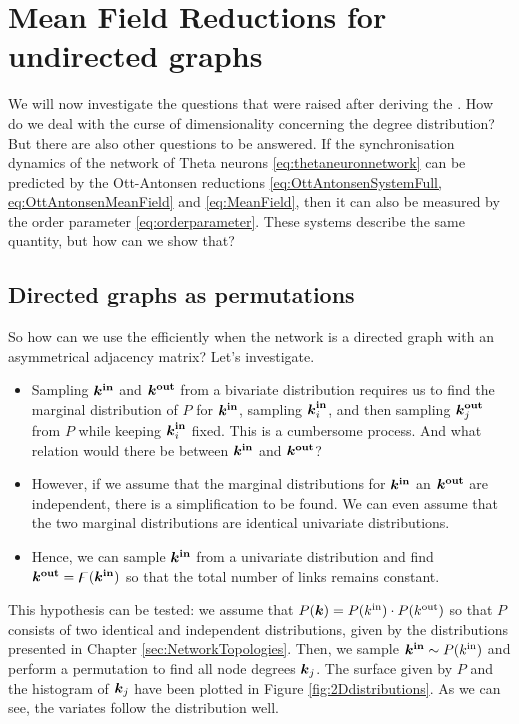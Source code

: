 \newpage
\section{\mywork Mean Field Reductions for undirected graphs}
We will now investigate the questions that were raised after deriving the \MFR. How do we deal with the curse of dimensionality concerning the degree distribution? But there are also other questions to be answered. If the synchronisation dynamics of the network of Theta neurons \eqref{eq:thetaneuronnetwork} can be predicted by the Ott-Antonsen reductions \cref{eq:OttAntonsenSystemFull, eq:OttAntonsenMeanField} and \eqref{eq:MeanField}, then it can also be measured by the order parameter \eqref{eq:orderparameter}. These systems describe the same quantity, but how can we show that?


\subsection{Directed graphs as permutations}
So how can we use the \MFR efficiently when the network is a directed graph with an asymmetrical adjacency matrix? Let's investigate.
\begin{itemize}
\item Sampling ${\boldsymbol{k^{\rm in}}}$ and $\boldsymbol{{k^{\rm out}}}$ from a bivariate distribution requires us to find the marginal distribution of $P$ for ${\boldsymbol{k^{\rm in}}}$, sampling ${\boldsymbol{k}_i^{\bf in}}$, and then sampling ${\boldsymbol{k}_j^{\bf out}}$ from $P$ while keeping ${\boldsymbol{k}_i^{\bf in}}$ fixed. This is a cumbersome process. And what relation would there be between ${\boldsymbol{k^{\rm in}}}$ and $\boldsymbol{{k^{\rm out}}}$?
\item However, if we assume that the marginal distributions for ${\boldsymbol{k^{\rm in}}}$ an $\boldsymbol{{k^{\rm out}}}$ are independent, there is a simplification to be found. We can even assume that the two marginal distributions are identical univariate distributions. 
\item Hence, we can sample ${\boldsymbol{k^{\rm in}}}$ from a univariate distribution and find $\boldsymbol{{k^{\rm out}}} = {\digamma} ( {\boldsymbol{k^{\rm in}}} )$ so that the total number of links remains constant. 
\end{itemize}

This hypothesis can be tested: we assume that $P({\boldsymbol{k}}) = P({k^{\rm in}}) \cdot P({k^{\rm out}})$ so that $P$ consists of two identical and independent distributions, given by the distributions presented in Chapter \ref{sec:NetworkTopologies}. Then, we sample ${\boldsymbol{k^{\rm in}}} \sim P({k^{\rm in}})$ and perform a permutation to find all node degrees ${\boldsymbol{k}}_j$. The surface given by $P$ and the histogram of ${\boldsymbol{k}}_j$ have been plotted in Figure \ref{fig:2Ddistributions}. As we can see, the variates follow the distribution well. 


